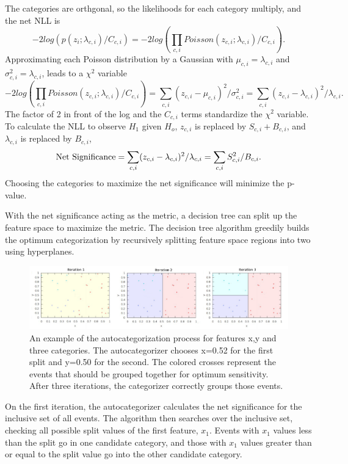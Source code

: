 \documentclass[review]{elsarticle}
\begin{document}
The categories are orthgonal, so the likelihoods for each category multiply, and the net NLL is  
\begin{equation}
\label{second}
-2log\left( p(z_i; \lambda_{c,i})/C_{c,i} \right) = -2log \left( \prod_{c,i} Poisson(z_{c,i}; \lambda_{c,i})/C_{c,i} \right) .
\end{equation}
Approximating each Poisson distribution by a Gaussian with $\mu_{c,i}=\lambda_{c,i}$ and $\sigma_{c,i}^2 = \lambda_{c,i}$, leads to a $\chi^2$ variable
\begin{equation}
-2log\left( \prod_{c,i} Poisson(z_{c,i}; \lambda_{c,i})/C_{c,i} \right) = \sum_{c,i}(z_{c,i}-\mu_{c,i})^{2}/\sigma^2_{c,i} 
= \sum_{c,i}(z_{c,i}-\lambda_{c,i})^{2}/\lambda_{c,i}.
\end{equation}
The factor of 2 in front of the log and the $C_{c,i}$ terms standardize the $\chi^2$ variable. To calculate the NLL to observe $H_1$ given $H_o$, $z_{c,i}$ is replaced by $S_{c,i} + B_{c,i}$, and $\lambda_{c,i}$ is replaced by $B_{c,i}$, 
\begin{equation}
{\rm Net~Significance} = \sum_{c,i}(z_{c,i}-\lambda_{c,i})^{2}/\lambda_{c,i} = \sum_{c,i}S_{c,i}^{2}/B_{c,i}.
\end{equation}
Choosing the categories to maximize the net significance will minimize the p-value. 

With the net significance acting as the metric, a decision tree\cite{cart84} can split up the feature space to maximize the metric. The decision tree algorithm greedily builds the optimum categorization by recursively splitting feature space regions into two using hyperplanes. 
\begin{figure}[h!]
  \centering
  \includegraphics[width=0.98\linewidth]{iter_all.png}
  \caption
  {An example of the autocategorization process for features x,y and three categories. The autocategorizer chooses x=0.52 for the first split and y=0.50 for the second. The colored crosses represent the events that should be grouped together for optimum sensitivity. After three iterations, the categorizer correctly groups those events.}
  \label{fig:iter_example}
\end{figure}
\FloatBarrier
On the first iteration, the autocategorizer calculates the net significance for the inclusive set of all events. The algorithm then searches over the inclusive set, checking all possible split values of the first feature, $x_1$. Events with $x_1$ values less than the split go in one candidate category, and those with $x_1$ values greater than or equal to the split value go into the other candidate category. 
\end{document}
